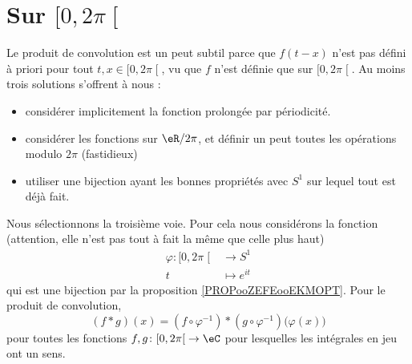 \section{Sur \( \mathopen[ 0 , 2\pi \mathclose[\)}

Le produit de convolution est un peut subtil parce que \( f(t-x)\) n'est pas défini à priori pour tout \( t,x\in \mathopen[ 0 , 2\pi \mathclose[\), vu que \( f\) n'est définie que sur \( \mathopen[ 0 , 2\pi \mathclose[\). Au moins trois solutions s'offrent à nous :
\begin{itemize}
	\item
	      considérer implicitement la fonction prolongée par périodicité.
	\item
	      considérer les fonctions sur \( \eR/2\pi\), et définir un peut toutes les opérations modulo \( 2\pi\) (fastidieux)
	\item
	      utiliser une bijection ayant les bonnes propriétés avec \( S^1\) sur lequel tout est déjà fait.
\end{itemize}
Nous sélectionnons la troisième voie. Pour cela nous considérons la fonction (attention, elle n'est pas tout à fait la même que celle plus haut)
\begin{equation}
	\begin{aligned}
		\varphi\colon \mathopen[ 0 , 2\pi \mathclose[ & \to S^1         \\
		t                                             & \mapsto  e^{it}
	\end{aligned}
\end{equation}
qui est une bijection par la proposition \ref{PROPooZEFEooEKMOPT}. Pour le produit de convolution,
\begin{equation}
	(f * g)(x)=(f\circ \varphi^{-1})*(g\circ\varphi^{-1})\big( \varphi(x) \big)
\end{equation}
pour toutes les fonctions \( f,g\colon \mathopen[ 0 , 2\pi \mathclose[\to \eC\) pour lesquelles les intégrales en jeu ont un sens.
